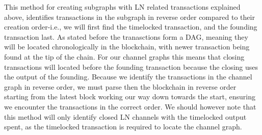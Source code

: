 This method for creating subgraphs with LN related transactions explained above, identifies transactions in the subgraph in reverse order 
compared to their creation order-i.e., we will first find the timelocked transaction, and the founding transaction last. As stated before the tranasctions form a DAG, meaning they will be located chronologically in the blockchain, with newer transaction being found at the tip of the chain. For our channel graphs this means that closing transactions will located before the founding transaction because the closing uses the output of the founding.
Because we identify the transactions in the channel graph in reverse order, we must parse then the blockchain in reverse order starting from the latest block working our way down towards the start, ensuring we encounter the transactions in the correct order. 
We should however note that this method will only identify closed LN channels with the timelocked output spent, as the timelocked transaction is required to locate the channel graph. 
\\

